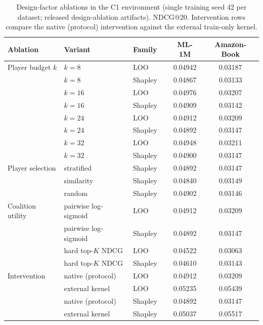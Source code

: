 \documentclass[pdflatex,sn-mathphys-num]{sn-jnl}
\begin{document}
\begin{table}[t]
\caption{Design-factor ablations in the C1 environment (single training seed 42 per dataset; released design-ablation artifacts). NDCG@20. Intervention rows compare the native (protocol) intervention against the external train-only kernel.}\label{tab:design_ablations}
\centering
\scriptsize
\begin{tabular}{llllcc}
\toprule
Ablation & Variant & Family & & ML-1M & Amazon-Book \\
\midrule
Player budget $k$ & $k=8$  & LOO     & & 0.04942 & 0.03187 \\
                    & $k=8$  & Shapley & & 0.04867 & 0.03133 \\
                    & $k=16$ & LOO     & & 0.04976 & 0.03207 \\
                    & $k=16$ & Shapley & & 0.04909 & 0.03142 \\
                    & $k=24$ & LOO     & & 0.04912 & 0.03209 \\
                    & $k=24$ & Shapley & & 0.04892 & 0.03147 \\
                    & $k=32$ & LOO     & & 0.04948 & 0.03211 \\
                    & $k=32$ & Shapley & & 0.04900 & 0.03147 \\
\midrule
Player selection & stratified & Shapley & & 0.04892 & 0.03147 \\
                 & similarity & Shapley & & 0.04840 & 0.03149 \\
                 & random     & Shapley & & 0.04902 & 0.03146 \\
\midrule
Coalition utility & pairwise log-sigmoid & LOO     & & 0.04912 & 0.03209 \\
                  & pairwise log-sigmoid & Shapley & & 0.04892 & 0.03147 \\
                  & hard top-$K$ NDCG    & LOO     & & 0.04522 & 0.03063 \\
                  & hard top-$K$ NDCG    & Shapley & & 0.04610 & 0.03143 \\
\midrule
Intervention & native (protocol) & LOO     & & 0.04912 & 0.03209 \\
             & external kernel   & LOO     & & 0.05235 & 0.05439 \\
             & native (protocol) & Shapley & & 0.04892 & 0.03147 \\
             & external kernel   & Shapley & & 0.05037 & 0.05517 \\
\bottomrule
\end{tabular}
\end{table}
\end{document}
